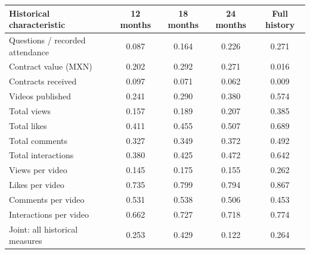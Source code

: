 \begingroup\small
\setlength{\tabcolsep}{3pt}
\renewcommand{\arraystretch}{1.25}
\noindent%
\begin{tabular*}{\linewidth}{@{\extracolsep{\fill}}lcccc@{}}
\toprule
Historical characteristic & 12 months & 18 months & 24 months & Full history \\
\midrule
Questions / recorded attendance & 0.087 & 0.164 & 0.226 & 0.271 \\
\addlinespace
Contract value (MXN) & 0.202 & 0.292 & 0.271 & 0.016 \\
Contracts received & 0.097 & 0.071 & 0.062 & 0.009 \\
\addlinespace
Videos published & 0.241 & 0.290 & 0.380 & 0.574 \\
Total views & 0.157 & 0.189 & 0.207 & 0.385 \\
Total likes & 0.411 & 0.455 & 0.507 & 0.689 \\
Total comments & 0.327 & 0.349 & 0.372 & 0.492 \\
Total interactions & 0.380 & 0.425 & 0.472 & 0.642 \\
Views per video & 0.145 & 0.175 & 0.155 & 0.262 \\
Likes per video & 0.735 & 0.799 & 0.794 & 0.867 \\
Comments per video & 0.531 & 0.538 & 0.506 & 0.453 \\
Interactions per video & 0.662 & 0.727 & 0.718 & 0.774 \\
\midrule
Joint: all historical measures & 0.253 & 0.429 & 0.122 & 0.264 \\
\bottomrule
\end{tabular*}\par\endgroup
